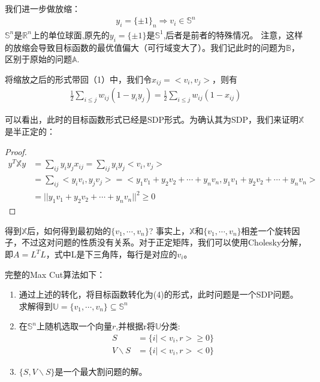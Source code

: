 \documentclass[lang=cn,newtx,10pt,scheme=chinese,chinesefont=nofont,citestyle=gb7714-2015, bibstyle=gb7714-2015]{elegantbook}
\begin{document}
\begin{refsection}
\noindent
我们进一步做放缩：
\begin{align}
    y_i=\{\pm1\}_n\Longrightarrow v_i\in\mathbb{S}^n 
\end{align}
    $\mathbb{S}^n\text{是}\mathbb{R}^n\text{上的单位球面}$,原先的$y_i = \{\pm1\}$是$\mathbb{S}^1$,后者是前者的特殊情况。
    注意，这样的放缩会导致目标函数的最优值偏大（可行域变大了）。我们记此时的问题为$\mathbb{B}$，区别于原始的问题$\mathbb{A}$.

\noindent
将缩放之后的形式带回（1）中，我们令$x_{ij}=<v_i,v_j>$，则有
\begin{align}
    \frac{1}{2}\sum_{i\le j}w_{ij}(1-y_iy_j)=\frac{1}{2}\sum_{i\le j}w_{ij}(1-x_{ij})
\end{align}

\noindent
可以看出，此时的目标函数形式已经是SDP形式。为确认其为SDP，我们来证明$\mathbb{X}$是半正定的：

\begin{proof}
\begin{align}
y^T\mathbb{X}y&=\sum_{ij}y_iy_jx_{ij}=\sum_{ij}y_iy_j<v_i,v_j>\\
&=\sum_{ij}<y_iv_i,y_jv_j>=<y_1v_1+y_2v_2+\cdots+y_nv_n,y_1v_1+y_2v_2+\cdots+y_nv_n>\\
&=||y_1v_1+y_2v_2+\cdots+y_nv_n||^2\geq 0
\end{align}
\end{proof}

    得到$\mathbb{X}$后，如何得到最初始的$\{v_1,\cdots,v_n\}$?
    事实上，$\mathbb{X}$和$\{v_1,\cdots,v_n\}$相差一个旋转因子，不过这对问题的性质没有关系。对于正定矩阵，我们可以使用Cholesky分解，即$A=L^TL$，式中L是下三角阵，每行是对应的$v_i$。


完整的Max Cut算法如下：
\begin{enumerate}
    \item 通过上述的转化，将目标函数转化为(4)的形式，此时问题是一个SDP问题。
    求解得到$\mathbb{U}=\{v_1,\cdots,v_n\}\subseteq \mathbb{S}^n$
    \item 在$\mathbb{S}^n$上随机选取一个向量$r$,并根据r将$\mathbb{U}$分类:
        \begin{align*}
            S&=\{i|<v_i,r>\ge 0\}\\
            V\backslash S&=\{i|<v_i,r>< 0\}
        \end{align*}
    \item $\{S,V\backslash S\}$是一个最大割问题的解。
\end{enumerate}


\end{refsection}
\end{document}
